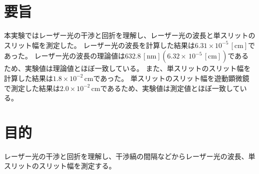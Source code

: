 \documentclass[paper=a4paper]{jlreq}
\newcommand{\TITLE}{title is here}
\newcommand{\NAME}{name is here}
\newcommand{\NUMBER}{class number is here}
\newcommand{\WEATHER}{weather is here}
\newcommand{\TEMPERATURE}{temperature is here}
\newcommand{\HUMIDITY}{humidity is here}
\newenvironment{Summary}{\section{要旨}}{}
\begin{document}




\begin{Summary}
  本実験ではレーザー光の干渉と回折を理解し、レーザー光の波長と単スリットのスリット幅を測定した。
  レーザー光の波長を計算した結果は$6.31 \times 10^{-5} \, [\mathrm{cm}]$であった。
  レーザー光の波長の理論値は$632.8 \, [\mathrm{nm}](6.32 \times \, 10^{-5} \, [\mathrm{cm}])$であるため、実験値は理論値とほぼ一致している。
  また、単スリットのスリット幅を計算した結果は$1.8 \times 10^{-2} \, \mathrm{cm}$であった。
  単スリットのスリット幅を遊動顕微鏡で測定した結果は$2.0 \times 10^{-2} \, \mathrm{cm}$であるため、実験値は測定値とほぼ一致している。
\end{Summary}

\section{目的}
レーザー光の干渉と回折を理解し、干渉縞の間隔などからレーザー光の波長、単スリットのスリット幅を測定する。
\end{document}
